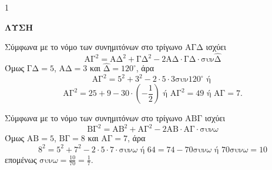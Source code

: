 \begin{ylh}{1}
    \item [Ύλη από εικόνα]
\end{ylh}
\textbf{ΛΥΣΗ}

\begin{alist}
    \item Σύμφωνα με το νόμο των συνημιτόνων στο τρίγωνο $\text{ΑΓΔ}$ ισχύει
    \[ \text{ΑΓ}^2 = \text{ΑΔ}^2 + \text{ΓΔ}^2 - 2\text{ΑΔ} \cdot \text{ΓΔ} \cdot \text{συν}\hat{\text{Δ}} \]
    Όμως $\text{ΓΔ} = 5$, $\text{ΑΔ} = 3$ και $\hat{\text{Δ}} = 120^\circ$, άρα
    \[ \text{ΑΓ}^2 = 5^2 + 3^2 - 2 \cdot 5 \cdot 3 \text{συν}120^\circ \text{ ή } \]
    \[ \text{ΑΓ}^2 = 25 + 9 - 30 \cdot \left(-\frac{1}{2}\right) \text{ ή } \text{ΑΓ}^2 = 49 \text{ ή } \text{ΑΓ} = 7. \]
    
    \item Σύμφωνα με το νόμο των συνημιτόνων στο τρίγωνο $\text{ΑΒΓ}$ ισχύει
    \[ \text{ΒΓ}^2 = \text{ΑΒ}^2 + \text{ΑΓ}^2 - 2\text{ΑΒ} \cdot \text{ΑΓ} \cdot \text{συν}\omega \]
    Όμως $\text{ΑΒ} = 5$, $\text{ΒΓ} = 8$ και $\text{ΑΓ} = 7$, άρα
    \[ 8^2 = 5^2 + 7^2 - 2 \cdot 5 \cdot 7 \cdot \text{συν}\omega \text{ ή } 64 = 74 - 70\text{συν}\omega \text{ ή } 70\text{συν}\omega = 10 \]
    επομένως $\text{συν}\omega = \frac{10}{70} = \frac{1}{7}$.
\end{alist}